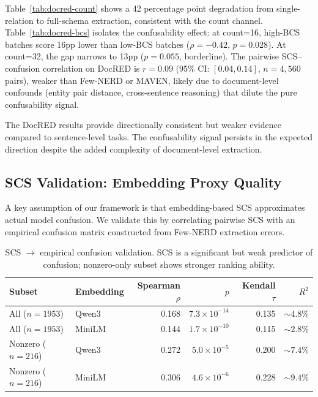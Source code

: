 \documentclass[11pt,a4paper]{article}
\begin{document}
Table~\ref{tab:docred-count} shows a 42 percentage point degradation from single-relation to full-schema extraction, consistent with the count channel. Table~\ref{tab:docred-bcs} isolates the confusability effect: at count=16, high-BCS batches score 16pp lower than low-BCS batches ($\rho{=}{-}0.42$, $p{=}0.028$). At count=32, the gap narrows to 13pp ($p{=}0.055$, borderline). The pairwise SCS--confusion correlation on DocRED is $r{=}0.09$ ($95\%$ CI: $[0.04, 0.14]$, $n{=}4{,}560$ pairs), weaker than Few-NERD or MAVEN, likely due to document-level confounds (entity pair distance, cross-sentence reasoning) that dilute the pure confusability signal.

The DocRED results provide directionally consistent but weaker evidence compared to sentence-level tasks. The confusability signal persists in the expected direction despite the added complexity of document-level extraction.

\subsection{SCS Validation: Embedding Proxy Quality}
\label{sec:scs-valid}

A key assumption of our framework is that embedding-based SCS approximates actual model confusion. We validate this by correlating pairwise SCS with an empirical confusion matrix constructed from Few-NERD extraction errors.

\begin{table}[t]
\centering
\caption{SCS $\rightarrow$ empirical confusion validation. SCS is a significant but weak predictor of confusion; nonzero-only subset shows stronger ranking ability.}
\label{tab:scs-valid}
\begin{tabular}{llrrrr}
\toprule
Subset & Embedding & Spearman $\rho$ & $p$ & Kendall $\tau$ & $R^2$ \\
\midrule
All ($n{=}1953$)     & Qwen3  & 0.168 & $7.3 \times 10^{-14}$ & 0.135 & ${\sim}4.8\%$ \\
All ($n{=}1953$)     & MiniLM & 0.144 & $1.7 \times 10^{-10}$ & 0.115 & ${\sim}2.8\%$ \\
Nonzero ($n{=}216$)  & Qwen3  & 0.272 & $5.0 \times 10^{-5}$  & 0.200 & ${\sim}7.4\%$ \\
Nonzero ($n{=}216$)  & MiniLM & 0.306 & $4.6 \times 10^{-6}$  & 0.228 & ${\sim}9.4\%$ \\
\bottomrule
\end{tabular}
\end{table}
\end{document}
